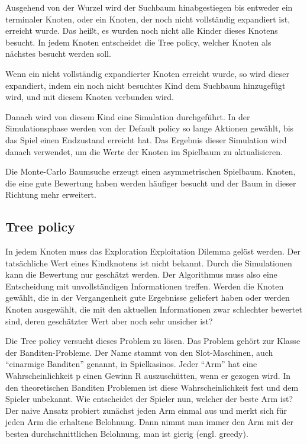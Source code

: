 Ausgehend von der Wurzel wird der Suchbaum hinabgestiegen bis entweder ein terminaler Knoten, oder ein Knoten, der noch nicht vollständig expandiert ist, erreicht wurde. Das heißt, es wurden noch nicht alle Kinder dieses Knotens besucht. In jedem Knoten entscheidet die Tree policy, welcher Knoten als nächstes besucht werden soll.
\par
Wenn ein nicht vollständig expandierter Knoten erreicht wurde, so wird dieser expandiert, indem ein noch nicht besuchtes Kind dem Suchbaum hinzugefügt wird, und mit diesem Knoten verbunden wird.
\par
Danach wird von diesem Kind eine Simulation durchgeführt. In der Simulationsphase werden von der Default policy so lange Aktionen gewählt, bis das Spiel einen Endzustand erreicht hat. Das Ergebnis dieser Simulation wird danach verwendet, um die Werte der Knoten im Spielbaum zu aktualisieren.\\
\par
Die Monte-Carlo Baumsuche erzeugt einen asymmetrischen Spielbaum. Knoten, die eine gute Bewertung haben werden häufiger besucht und der Baum in dieser Richtung mehr erweitert.
\subsection{Tree policy}
In jedem Knoten muss das Exploration Exploitation Dilemma gelöst werden. Der tatsächliche Wert eines Kindknotens ist nicht bekannt. Durch die Simulationen kann die Bewertung nur geschätzt werden. Der Algorithmus muss also eine Entscheidung mit unvollständigen Informationen treffen. Werden die Knoten gewählt, die in der Vergangenheit gute Ergebnisse geliefert haben oder werden Knoten ausgewählt, die mit den aktuellen Informationen zwar schlechter bewertet sind, deren geschätzter Wert aber noch sehr unsicher ist?\\
\par
Die Tree policy versucht dieses Problem zu lösen. Das Problem gehört zur Klasse der Banditen-Probleme. Der Name stammt von den Slot-Maschinen, auch “einarmige Banditen” genannt, in Spielkasinos. Jeder “Arm” hat eine Wahrscheinlichkeit p einen Gewinn R auszuschütten, wenn er gezogen wird. In den theoretischen Banditen Problemen ist diese Wahrscheinlichkeit fest und dem Spieler unbekannt. Wie entscheidet der Spieler nun, welcher der beste Arm ist? Der naive Ansatz probiert zunächst jeden Arm einmal aus und merkt sich für jeden Arm die erhaltene Belohnung. Dann nimmt man immer den Arm mit der besten durchschnittlichen Belohnung, man ist gierig (engl. greedy).
